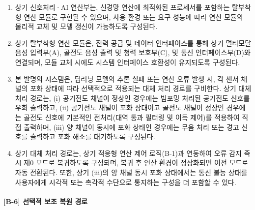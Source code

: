 \documentclass{article}
\DeclareRobustCommand{\codexedit}[1]{\textcolor{customorange}{#1}}
\begin{document}
\begin{enumerate}[label = \textbf{(B.5.\arabic*)}]

    \item 상기 신호처리·AI 연산부는, 신경망 연산에 최적화된 프로세서를 포함하는 탈부착형 연산 모듈로 구현될 수 있으며, 사용 환경 또는 요구 성능에 따라 연산 모듈의 물리적 교체 및 모델 갱신이 가능하도록 구성된다.

    \item 상기 탈부착형 연산 모듈은, 전력 공급 및 데이터 인터페이스를 통해 상기 멀티모달 음성 입력부(A), 골전도 음성 출력 및 청력 보호부(C), 및 통신 인터페이스부(D)와 연결되며, 모듈 교체 시에도 시스템 인터페이스 호환성이 유지되도록 구성된다.

    \item \codexedit{본 발명의 시스템은, 딥러닝 모델의 추론 실패 또는 연산 오류 발생 시, 각 센서 채널의 포화 상태에 따라 선택적으로 적용되는 대체 처리 경로를 구비한다. 상기 대체 처리 경로는, (i) 공기전도 채널이 정상인 경우에는 빔포밍 처리된 공기전도 신호를 우회 출력하고, (ii) 공기전도 채널이 포화 상태이고 골전도 채널이 정상인 경우에는 골전도 신호에 기본적인 전처리(대역 통과 필터링 및 이득 제어)를 적용하여 직접 출력하며, (iii) 양 채널이 동시에 포화 상태인 경우에는 무음 처리 또는 경고 신호를 출력하고 포화 해소를 대기하도록 구성된다.}

    \item \codexedit{상기 대체 처리 경로는, 상기 적응형 연산 제어 로직(B-1)과 연동하여 오류 감지 즉시 제0 모드로 복귀하도록 구성되며, 복귀 후 연산 환경이 정상화되면 이전 모드로 자동 전환된다. 또한, 상기 (iii)의 양 채널 동시 포화 상태에서는 통신 불능 상태를 사용자에게 시각적 또는 촉각적 수단으로 통지하는 구성을 더 포함할 수 있다.}
\end{enumerate}


\paragraph{[B-6] 선택적 보조 복원 경로}
\end{document}
